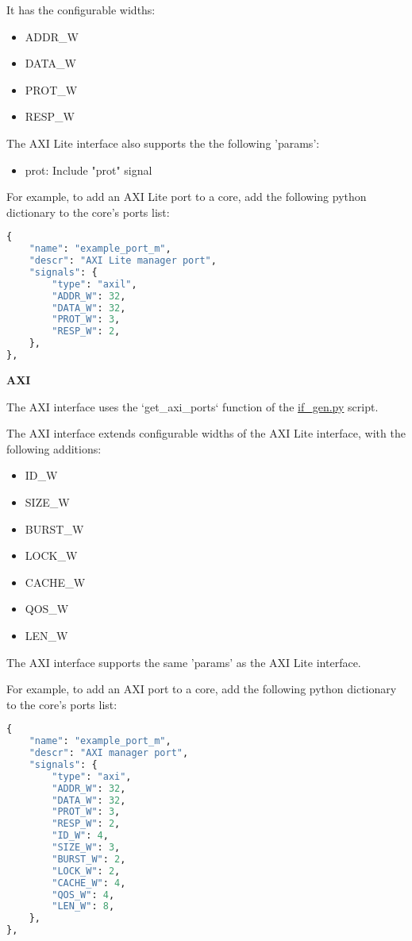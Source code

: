 
It has the configurable widths: 
\begin{itemize}
  \item ADDR\_W
  \item DATA\_W
  \item PROT\_W
  \item RESP\_W
\end{itemize}

The AXI Lite interface also supports the the following 'params':
\begin{itemize}
  \item prot: Include "prot" signal
\end{itemize}

For example, to add an AXI Lite port to a core, add the following python dictionary to the core's ports list:
\begin{lstlisting}[language=python]
{
	"name": "example_port_m",
	"descr": "AXI Lite manager port",
	"signals": {
		"type": "axil",
		"ADDR_W": 32,
		"DATA_W": 32,
		"PROT_W": 3,
		"RESP_W": 2,
	},
},
\end{lstlisting}


%
%
\clearpage
\large\textbf{AXI}

The AXI interface uses the `get\_axi\_ports` function of the \href{https://github.com/IObundle/py2hwsw/blob/main/py2hwsw/scripts/if_gen.py}{if\_gen.py} script.


The AXI interface extends configurable widths of the AXI Lite interface, with the following additions:
\begin{itemize}
  \item ID\_W
  \item SIZE\_W
  \item BURST\_W
  \item LOCK\_W
  \item CACHE\_W
  \item QOS\_W
  \item LEN\_W
\end{itemize}

The AXI interface supports the same 'params' as the AXI Lite interface.

For example, to add an AXI port to a core, add the following python dictionary to the core's ports list:
\begin{lstlisting}[language=python]
{
	"name": "example_port_m",
	"descr": "AXI manager port",
	"signals": {
		"type": "axi",
		"ADDR_W": 32,
		"DATA_W": 32,
		"PROT_W": 3,
		"RESP_W": 2,
		"ID_W": 4,
		"SIZE_W": 3,
		"BURST_W": 2,
		"LOCK_W": 2,
		"CACHE_W": 4,
		"QOS_W": 4,
		"LEN_W": 8,
	},
},
\end{lstlisting}



